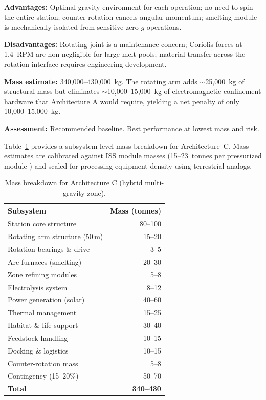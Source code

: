 \documentclass[preprint,12pt]{elsarticle}
\begin{document}
\textbf{Advantages:} Optimal gravity environment for each operation; no need to spin the entire station; counter-rotation cancels angular momentum; smelting module is mechanically isolated from sensitive zero-$g$ operations.

\textbf{Disadvantages:} Rotating joint is a maintenance concern; Coriolis forces at 1.4~RPM are non-negligible for large melt pools; material transfer across the rotation interface requires engineering development.

\textbf{Mass estimate:} 340,000--430,000~kg. The rotating arm adds $\sim$25,000~kg of structural mass but eliminates $\sim$10,000--15,000~kg of electromagnetic confinement hardware that Architecture A would require, yielding a net penalty of only 10,000--15,000~kg.

\textbf{Assessment:} Recommended baseline. Best performance at lowest mass and risk.

Table~\ref{tab:mass-breakdown} provides a subsystem-level mass breakdown for Architecture~C. Mass estimates are calibrated against ISS module masses (15--23~tonnes per pressurized module \cite{benaroya2002}) and scaled for processing equipment density using terrestrial analogs.

\begin{table}[ht]
\centering
\caption{Mass breakdown for Architecture C (hybrid multi-gravity-zone).}
\label{tab:mass-breakdown}
\begin{tabular}{lr}
\toprule
Subsystem & Mass (tonnes) \\
\midrule
Station core structure & 80--100 \\
Rotating arm structure (50\,m) & 15--20 \\
Rotation bearings \& drive & 3--5 \\
Arc furnaces (smelting) & 20--30 \\
Zone refining modules & 5--8 \\
Electrolysis system & 8--12 \\
Power generation (solar) & 40--60 \\
Thermal management & 15--25 \\
Habitat \& life support & 30--40 \\
Feedstock handling & 10--15 \\
Docking \& logistics & 10--15 \\
Counter-rotation mass & 5--8 \\
Contingency (15--20\%) & 50--70 \\
\midrule
\textbf{Total} & \textbf{340--430} \\
\bottomrule
\end{tabular}
\end{table}
\end{document}
